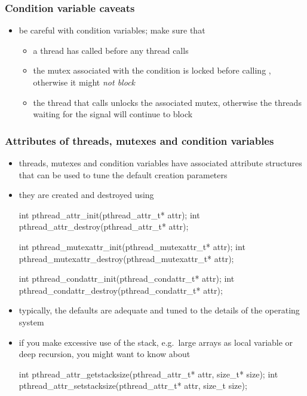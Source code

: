 \begin{frame}[fragile]
%
  \frametitle{Condition variable caveats}
%
  \begin{itemize}
%
  \item be careful with condition variables; make sure that
    \begin{itemize}
    \item a thread has called  before any thread
      calls 
    \item the mutex associated with the condition is locked before calling
      , otherwise it might {\em not block}
    \item the thread that calls  unlocks the associated
      mutex, otherwise the threads waiting for the signal will continue to block
    \end{itemize}
%
%
  \end{itemize}
%
\end{frame}

\begin{frame}[fragile]
%
  \frametitle{Attributes of threads, mutexes and condition variables}
%
  \begin{itemize}
%
  \item threads, mutexes and condition variables have associated attribute structures that can
    be used to tune the default creation parameters
%
  \item they are created and destroyed using
%
    \begin{C}
int pthread_attr_init(pthread_attr_t* attr);
int pthread_attr_destroy(pthread_attr_t* attr);

int pthread_mutexattr_init(pthread_mutexattr_t* attr);
int pthread_mutexattr_destroy(pthread_mutexattr_t* attr);

int pthread_condattr_init(pthread_condattr_t* attr);
int pthread_condattr_destroy(pthread_condattr_t* attr);
    \end{C}
%
  \item typically, the defaults are adequate and tuned to the details of the operating system
%
  \item if you make excessive use of the stack, e.g.~large arrays as local variable or deep
    recursion, you might want to know about
%
    \begin{C}
int pthread_attr_getstacksize(pthread_attr_t* attr, size_t* size);
int pthread_attr_setstacksize(pthread_attr_t* attr, size_t size);
    \end{C}
%
  \end{itemize}
%
\end{frame}

